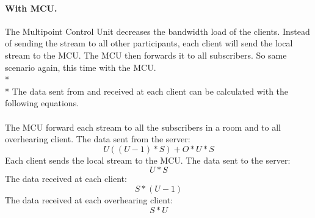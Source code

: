 \documentclass[12pt, titlepage]{article}
\begin{document}
\paragraph{With MCU.}
The Multipoint Control Unit decreases the bandwidth load of the clients. Instead of sending the stream to all other participants, each client will send the local stream to the MCU. The MCU then forwards it to all subscribers.
So same scenario again, this time with the MCU.
\\*
\\*
The data sent from and received at each client can be calculated with the following equations.\\\\
The MCU forward each stream to all the subscribers in a room and to all overhearing client. The data sent from the server:
\begin{equation}
U((U-1)*S) + O*U*S
\end{equation} 
Each client sends the local stream to the MCU. The data sent to the server:
\begin{equation}
U*S
\end{equation} 
The data received at each client:
\begin{equation}
S*(U-1)
\end{equation} 
The data received at each overhearing client:
\begin{equation}
S*U
\end{equation} 
\end{document}
